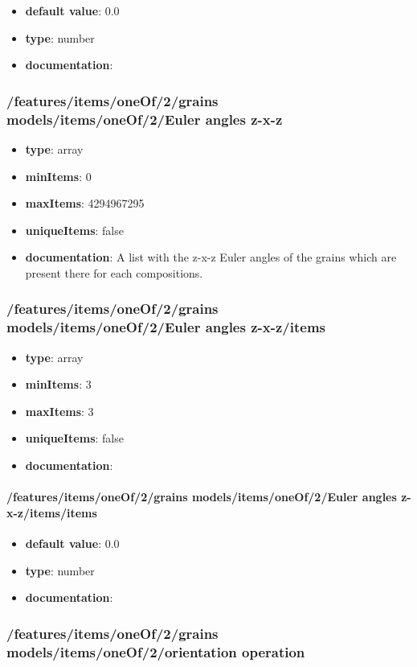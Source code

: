 \begin{itemize}\item {\bf default value}: 0.0
\item {\bf type}: number
\item {\bf documentation}: 
\end{itemize}\subsubsection{/features/items/oneOf/2/grains models/items/oneOf/2/Euler angles z-x-z}
\begin{itemize}\item {\bf type}: array
\item {\bf minItems}: 0
\item {\bf maxItems}: 4294967295
\item {\bf uniqueItems}: false
\item {\bf documentation}: A list with the z-x-z Euler angles of the grains which are present there for each compositions.
\end{itemize}\subsubsection{/features/items/oneOf/2/grains models/items/oneOf/2/Euler angles z-x-z/items}
\begin{itemize}\item {\bf type}: array
\item {\bf minItems}: 3
\item {\bf maxItems}: 3
\item {\bf uniqueItems}: false
\item {\bf documentation}: 
\end{itemize}\paragraph{/features/items/oneOf/2/grains models/items/oneOf/2/Euler angles z-x-z/items/items}
\begin{itemize}\item {\bf default value}: 0.0
\item {\bf type}: number
\item {\bf documentation}: 
\end{itemize}\subsubsection{/features/items/oneOf/2/grains models/items/oneOf/2/orientation operation}
